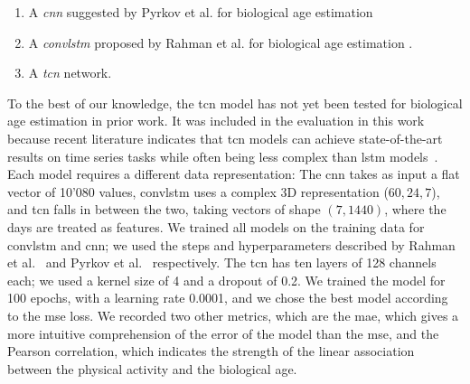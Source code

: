 \begin{enumerate}
    \item A \textit{\gls{cnn}} suggested by Pyrkov et al. for biological age estimation \cite{pyrkov_extracting_2018}
    \item A \textit{\gls{convlstm}} proposed by Rahman et al. for biological age estimation \cite{rahman_deep_2019}.
    \item A \textit{\gls{tcn}} \cite{lea_temporal_2016, bai_empirical_2018} network. 
    \end{enumerate}
To the best of our knowledge, the \gls{tcn} model has not yet been tested for biological age estimation in prior work. It was included in the evaluation in this work because recent literature indicates that \gls{tcn} models can achieve state-of-the-art results on time series tasks while often being less complex than \gls{lstm} models~\cite{bai_empirical_2018}.
Each model requires a different data representation: The \gls{cnn} takes as input a flat vector of 10'080 values, \gls{convlstm} uses a complex 3D representation ($60, 24, 7$), and \gls{tcn} falls in between the two, taking vectors of shape $(7, 1440)$, where the days are treated as features. We trained all models on the training data for \gls{convlstm} and \gls{cnn}; we used the steps and hyperparameters described by Rahman et al.~\cite{rahman_deep_2019} and Pyrkov et al.~\cite{pyrkov_extracting_2018} respectively.
The \gls{tcn} has ten layers of 128 channels each; we used a kernel size of 4 and a dropout of 0.2. We trained the model for 100 epochs, with a learning rate 0.0001, and we chose the best model according to the \gls{mse} loss. We recorded two other metrics, which are the \gls{mae}, which gives a more intuitive comprehension of the error of the model than the \gls{mse}, and the Pearson correlation, which indicates the strength of the linear association between the physical activity and the biological age. 

